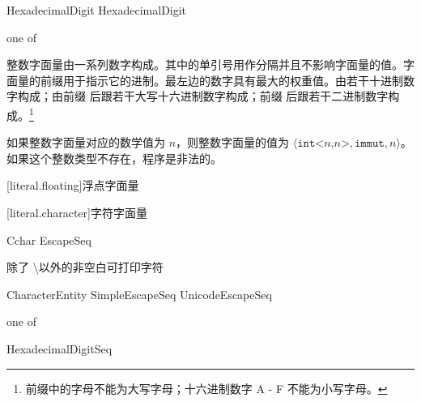 \begin{bnf}
 \br
     HexadecimalDigit \bnflp\terminal{\textquotesingle}\bnfq HexadecimalDigit\bnfrp\bnfs
\end{bnf}

\begin{bnf}
 \textnormal{one of} \br
     \br
\end{bnf}

\pnum
整数字面量由一系列数字构成。其中的单引号用作分隔并且不影响字面量的值。字面量的前缀用于指示它的进制。最左边的数字具有最大的权重值。由若干十进制数字构成；由前缀  后跟若干大写十六进制数字构成；前缀  后跟若干二进制数字构成。\footnote{前缀中的字母不能为大写字母；十六进制数字 A - F 不能为小写字母。}

\pnum
如果整数字面量对应的数学值为 $n$，则整数字面量的值为 $\langle \texttt{int<} n \texttt{,} n \texttt{>}, \texttt{immut}, n \rangle$。如果这个整数类型不存在，程序是非法的。

[literal.floating]{浮点字面量}

[literal.character]{字符字面量}

\begin{bnf}
 \br
    \terminal{\textquotesingle} Cchar \br
    \terminal{\textquotesingle} EscapeSeq
\end{bnf}

\begin{bnf}
 \br
    \textnormal{除了 \textbackslash 以外的非空白可打印字符}
\end{bnf}

\begin{bnf}
 \br
    CharacterEntity
    SimpleEscapeSeq
    UnicodeEscapeSeq
\end{bnf}

\begin{bnf}
 \textnormal{one of} \br
\end{bnf}

\begin{bnf}
 \br
     HexadecimalDigitSeq \terminal{\}}
\end{bnf}

